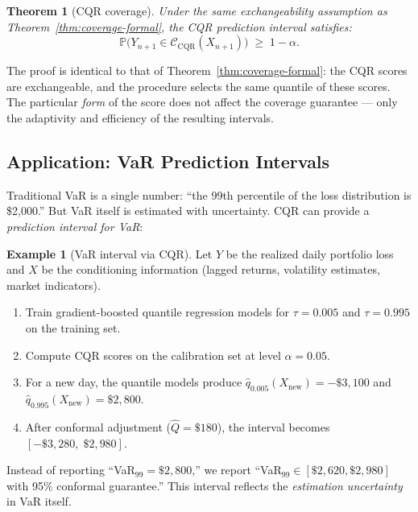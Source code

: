 \documentclass[11pt, a4paper]{article}
\theoremstyle{definition}
\newtheorem{example}{Example}[section]
\theoremstyle{plain}
\newtheorem{theorem}{Theorem}[section]
\theoremstyle{remark}
\newcommand{\PV}{\mathbb{P}}
\newcommand{\Ccal}{\mathcal{C}}
\begin{document}
\begin{theorem}[CQR coverage]\label{thm:cqr-coverage}
Under the same exchangeability assumption as Theorem~\ref{thm:coverage-formal},
the CQR prediction interval satisfies:
\begin{equation}
    \PV\bigl(Y_{n+1} \in \Ccal_{\mathrm{CQR}}(X_{n+1})\bigr) \;\geq\; 1 - \alpha.
\end{equation}
\end{theorem}

The proof is identical to that of Theorem~\ref{thm:coverage-formal}: the CQR
scores are exchangeable, and the procedure selects the same quantile of these
scores.
The particular \emph{form} of the score does not affect the coverage guarantee
--- only the adaptivity and efficiency of the resulting intervals.

\subsection{Application: VaR Prediction Intervals}

Traditional VaR is a single number: ``the 99th percentile of the loss distribution
is \$2{,}000.''
But VaR itself is estimated with uncertainty.
CQR can provide a \emph{prediction interval for VaR}:

\begin{example}[VaR interval via CQR]\label{ex:var-cqr}
Let $Y$ be the realized daily portfolio loss and $X$ be the conditioning information
(lagged returns, volatility estimates, market indicators).
\begin{enumerate}
    \item Train gradient-boosted quantile regression models for $\tau = 0.005$
          and $\tau = 0.995$ on the training set.
    \item Compute CQR scores on the calibration set at level $\alpha = 0.05$.
    \item For a new day, the quantile models produce
          $\hat{q}_{0.005}(X_{\mathrm{new}}) = -\$3{,}100$ and
          $\hat{q}_{0.995}(X_{\mathrm{new}}) = \$2{,}800$.
    \item After conformal adjustment ($\hat{Q} = \$180$), the interval becomes
          $[-\$3{,}280,\; \$2{,}980]$.
\end{enumerate}
Instead of reporting ``VaR$_{99} = \$2{,}800$,'' we report
``VaR$_{99} \in [\$2{,}620, \$2{,}980]$ with 95\% conformal guarantee.''
This interval reflects the \emph{estimation uncertainty} in VaR itself.
\end{example}
\end{document}
